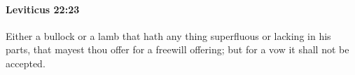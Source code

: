 
		\paragraph{Leviticus 22:23} %
			\label{LEVITICUS-22-23}

			Either a bullock or a lamb that hath any thing superfluous or lacking in his parts, that mayest thou offer for a freewill offering; but for a vow it shall not be accepted.


